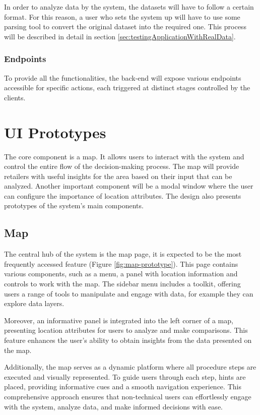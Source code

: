 In order to analyze data by the system, the datasets will have to follow a certain format. For this reason, a user who sets the system up will have to use some parsing tool to convert the original dataset into the required one. This process will be described in detail in section \ref{sec:testingApplicationWithRealData}.

\subsubsection{Endpoints}

To provide all the functionalities, the back-end will expose various endpoints accessible for specific actions, each triggered at distinct stages controlled by the clients.

\section{UI Prototypes}

The core component is a map. It allows users to interact with the system and control the entire flow of the decision-making process. The map will provide retailers with useful insights for the area based on their input that can be analyzed. Another important component will be a modal window where the user can configure the importance of location attributes. The design also presents prototypes of the system's main components.

\subsection{Map}

The central hub of the system is the map page, it is expected to be the most frequently accessed feature (Figure \ref{fig:map-prototype}). This page contains various components, such as a menu, a panel with location information and controls to work with the map. The sidebar menu includes a toolkit, offering users a range of tools to manipulate and engage with data, for example they can explore data layers.

Moreover, an informative panel is integrated into the left corner of a map, presenting location attributes for users to analyze and make comparisons. This feature enhances the user's ability to obtain insights from the data presented on the map.

Additionally, the map serves as a dynamic platform where all procedure steps are executed and visually represented. To guide users through each step, hints are placed, providing informative cues and a smooth navigation experience. This comprehensive approach ensures that non-technical users can effortlessly engage with the system, analyze data, and make informed decisions with ease.


